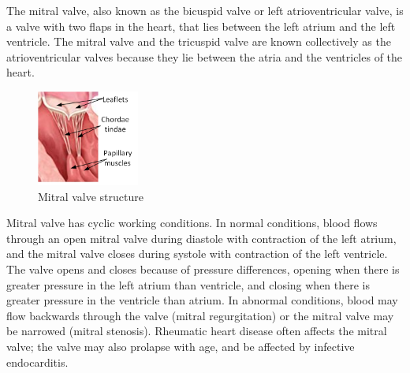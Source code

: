 The mitral valve, also known as the bicuspid valve or left atrioventricular
valve, is a valve with two flaps in the heart, that lies between the left atrium
and the left ventricle. The mitral valve and the tricuspid valve are known
collectively as the atrioventricular valves because they lie between the atria
and the ventricles of the heart.\par
\begin{figure}[H]
  \centering
  \includegraphics[width=0.3\textwidth]{./fig/mt.png}
  \caption{Mitral valve structure}
  \label{fig:MT}
\end{figure}
Mitral valve has cyclic working conditions.
In normal conditions, blood flows through an open mitral valve during diastole
with contraction of the left atrium, and the mitral valve closes during systole
with contraction of the left ventricle. The valve opens and closes because of
pressure differences, opening when there is greater pressure in the left atrium
than ventricle, and closing when there is greater pressure in the ventricle than
atrium. In abnormal conditions, blood may flow backwards through the valve
(mitral regurgitation) or the mitral valve may be narrowed (mitral stenosis).
Rheumatic heart disease often affects the mitral valve; the valve may also
prolapse with age, and be affected by infective endocarditis.
